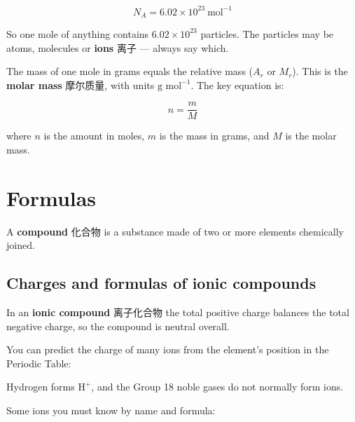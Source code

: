 \documentclass[11pt]{article}
\begin{document}
\[
N_A = 6.02 \times 10^{23}\ \text{mol}^{-1}
\]

So one mole of anything contains $6.02 \times 10^{23}$ particles. The particles may be atoms, molecules or \textbf{ions} 离子 — always say which.

The mass of one mole in grams equals the relative mass ($A_r$ or $M_r$). This is the \textbf{molar mass} 摩尔质量, with units $\text{g mol}^{-1}$. The key equation is:

\[
n = \frac{m}{M}
\]

where $n$ is the amount in moles, $m$ is the mass in grams, and $M$ is the molar mass.

\section*{Formulas}

A \textbf{compound} 化合物 is a substance made of two or more elements chemically joined.

\subsection*{Charges and formulas of ionic compounds}

In an \textbf{ionic compound} 离子化合物 the total positive charge balances the total negative charge, so the compound is neutral overall.

You can predict the charge of many ions from the element's position in the Periodic Table:

\begin{center}
\end{center}

Hydrogen forms $\text{H}^+$, and the Group 18 noble gases do not normally form ions.

Some ions you must know by name and formula:
\end{document}
